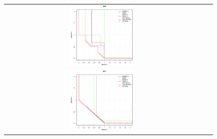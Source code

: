 \begin{figure}[H]
\begin{tabular}{ccc}
  \includegraphics[width=0.33\textwidth]{Figures_Chapter7/Results_Chapter4/Surface_Representative/UF6.eps} \\
  \includegraphics[width=0.33\textwidth]{Figures_Chapter7/Results_Chapter4/Surface_Representative/UF7.eps} 
\end{tabular}
\end{figure}


